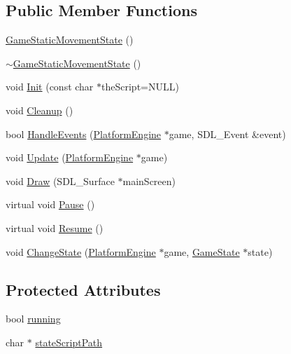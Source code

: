 \subsection*{Public Member Functions}
\begin{CompactItemize}
\item 
\hyperlink{class_game_static_movement_state_13354d331108d7aeb78822e629d631b3}{GameStaticMovementState} ()
\item 
\hyperlink{class_game_static_movement_state_3b89c6650fba993b81abd1d5b11a82c3}{$\sim$GameStaticMovementState} ()
\item 
void \hyperlink{class_game_static_movement_state_4cb4be5ea96a6bb7b06c79bed64c355d}{Init} (const char $\ast$theScript=NULL)
\item 
void \hyperlink{class_game_static_movement_state_072662abaf5a872f7919e7fc44200a04}{Cleanup} ()
\item 
bool \hyperlink{class_game_static_movement_state_c73d6f93fee2ac6cb2788eb2984bb305}{HandleEvents} (\hyperlink{class_platform_engine}{PlatformEngine} $\ast$game, SDL\_\-Event \&event)
\item 
void \hyperlink{class_game_static_movement_state_5a3bd910a85487be371c088a1be16996}{Update} (\hyperlink{class_platform_engine}{PlatformEngine} $\ast$game)
\item 
void \hyperlink{class_game_static_movement_state_2c2d82b3dbc8e431682b53ce05294f27}{Draw} (SDL\_\-Surface $\ast$mainScreen)
\item 
virtual void \hyperlink{class_game_state_0c47c6969a4e0bb32d6cdf7bf9376817}{Pause} ()
\item 
virtual void \hyperlink{class_game_state_d12ece3c3fb066281b73b07a315f04e8}{Resume} ()
\item 
void \hyperlink{class_game_state_f786aeb704a22a135dc289bb89fcc452}{ChangeState} (\hyperlink{class_platform_engine}{PlatformEngine} $\ast$game, \hyperlink{class_game_state}{GameState} $\ast$state)
\end{CompactItemize}
\subsection*{Protected Attributes}
\begin{CompactItemize}
\item 
bool \hyperlink{class_game_state_391df04a740c7480270d3c71a578b43a}{running}
\item 
char $\ast$ \hyperlink{class_game_state_bfe09abe78dd5794426964d3392b2973}{stateScriptPath}
\end{CompactItemize}


